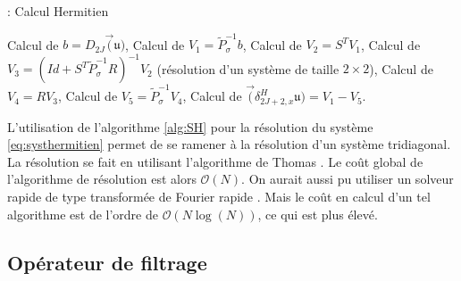 \begin{center}
\begin{minipage}[H]{12cm}
  \begin{algorithm}[H]
    \caption{: Calcul Hermitien}\label{alg:SH}
    \begin{algorithmic}[1]
    \State Calcul de $b = D_{2J} \vec (\mathfrak{u})$,
	\State Calcul de $V_1 = \tilde{P}_{\sigma}^{-1} b$,
	\State Calcul de $V_2 = S^T V_1$,
	\State Calcul de $V_3 = (Id + S^T \tilde{P}_{\sigma}^{-1}R)^{-1} V_2$ (résolution d'un système de taille $2 \times 2$),
	\State Calcul de $V_4 = R V_3$,
	\State Calcul de $V_5 = \tilde{P}_{\sigma}^{-1} V_4$,
	\State Calcul de $\vec (\delta_{2J+2,x}^H \mathfrak{u}) = V_1 - V_5$.
    \end{algorithmic}
    \end{algorithm}
\end{minipage}
\end{center}

L'utilisation de l'algorithme \ref{alg:SH} pour la résolution du système \eqref{eq:systhermitien} permet de se ramener à la résolution d'un système tridiagonal. La résolution se fait en utilisant l'algorithme de Thomas \cite{Conte2017,Quarteroni2010}. Le coût global de l'algorithme de résolution est alors $\mathcal{O}(N)$. On aurait aussi pu utiliser un solveur rapide de type transformée de Fourier rapide \cite{VanLoan1992}. Mais le coût en calcul d'un tel algorithme est de l'ordre de $\mathcal{O}(N \log (N))$, ce qui est plus élevé.























\subsection{Opérateur de filtrage}

